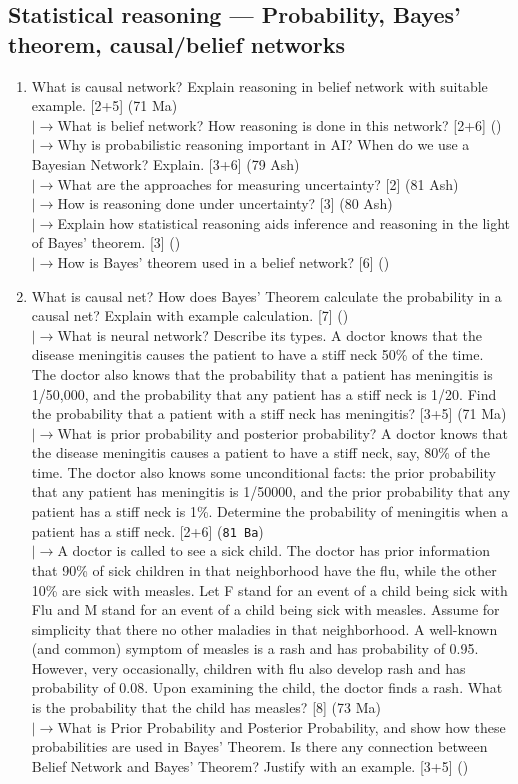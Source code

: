 \documentclass[12pt]{article}
\newcommand{\lb}{\\$\left|\rightarrow\right.$}
\begin{document}
  \subsection{Statistical reasoning --- Probability, Bayes' theorem, causal/belief networks}
    \begin{enumerate}[topsep=0pt, noitemsep]
      \item What is causal network? Explain reasoning in belief network with suitable example. \hfill [2+5] (71 Ma)
        \lb What is belief network? How reasoning is done in this network? \hfill [2+6] ()
        \lb Why is probabilistic reasoning important in AI? When do we use a Bayesian Network? Explain. \hfill [3+6] (79 Ash)
        \lb What are the approaches for measuring uncertainty? \hfill [2] (81 Ash)
        \lb How is reasoning done under uncertainty? \hfill [3] (80 Ash)
        \lb Explain how statistical reasoning aids inference and reasoning in the light of Bayes' theorem. \hfill [3] ()
        \lb How is Bayes' theorem used in a belief network? \hfill [6] ()

      \item What is causal net? How does Bayes' Theorem calculate the probability in a causal net? Explain with example calculation. \hfill [7] ()
        \lb What is neural network? Describe its types. A doctor knows that the disease meningitis causes the patient to have a stiff neck 50\% of the time. The doctor also knows that the probability that a patient has meningitis is 1/50,000, and the probability that any patient has a stiff neck is 1/20. Find the probability that a patient with a stiff neck has meningitis? \hfill [3+5] (71 Ma)
        \lb What is prior probability and posterior probability? A doctor knows that the disease meningitis causes a patient to have a stiff neck, say, 80\% of the time. The doctor also knows some unconditional facts: the prior probability that any patient has meningitis is 1/50000, and the prior probability that any patient has a stiff neck is 1\%. Determine the probability of meningitis when a patient has a stiff neck. \hfill [2+6] (\texttt{81 Ba})
        \lb A doctor is called to see a sick child. The doctor has prior information that 90\% of sick children in that neighborhood have the flu, while the other 10\% are sick with measles. Let F stand for an event of a child being sick with Flu and M stand for an event of a child being sick with measles. Assume for simplicity that there no other maladies in that neighborhood. A well-known (and common) symptom of measles is a rash and has probability of 0.95. However, very occasionally, children with flu also develop rash and has probability of 0.08. Upon examining the child, the doctor finds a rash. What is the probability that the child has measles? \hfill [8] (73 Ma)
        \lb What is Prior Probability and Posterior Probability, and show how these probabilities are used in Bayes' Theorem. Is there any connection between Belief Network and Bayes' Theorem? Justify with an example. \hfill [3+5] ()


\end{enumerate}
\end{document}
